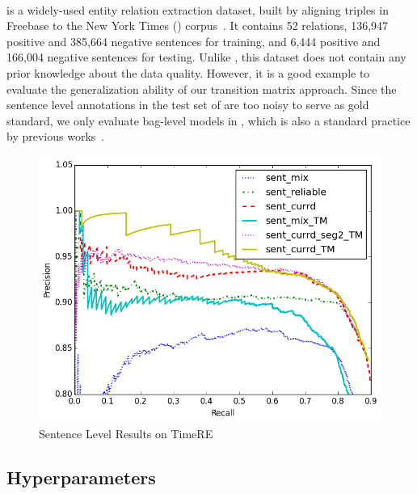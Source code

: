 \paragraph{\EntityRE} is a widely-used entity
relation extraction dataset, built %
by aligning triples
in Freebase to the New York Times (\NYT) corpus~\cite{riedel2010modeling}. It contains 52 relations, 136,947 positive and 385,664 negative sentences for training, and 6,444 positive and 166,004 negative sentences  for testing.
Unlike \TimeRE, this dataset does not contain any prior knowledge about the data quality.
However, it is a good example to evaluate the generalization ability of our transition matrix approach.
Since the sentence level annotations in the test set of \EntityRE are too noisy to serve as gold standard,  we only evaluate bag-level models in \EntityRE, which is also a standard practice by previous works~\cite{surdeanu2012multi,zeng2015distant,lin2016neural}.


\begin{figure}[t!]
\begin{center}
\includegraphics[width=0.9\linewidth]{figures/sent_time_exp_overall.png}
\caption{Sentence Level Results on TimeRE}
\label{fig: sent_luo}
\end{center}
\end{figure}


\subsection{Hyperparameters}

